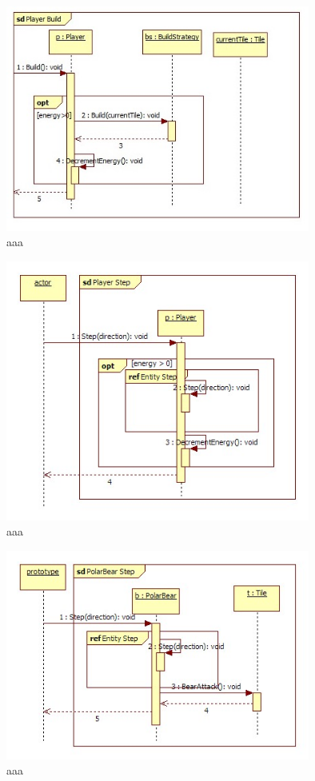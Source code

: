 \begin{figure}[H]
        \begin{center}
                \includegraphics[width=10cm]{chapters/chapter07/seqdiag/Player_Build.jpg}
                \caption{aaa}
                \label{bbb}
        \end{center}
\end{figure}
\begin{figure}[H]
        \begin{center}
                \includegraphics[width=10cm]{chapters/chapter07/seqdiag/Player_Step.jpg}
                \caption{aaa}
                \label{bbb}
        \end{center}
\end{figure}
\begin{figure}[H]
        \begin{center}
                \includegraphics[width=10cm]{chapters/chapter07/seqdiag/PolarBear_Step.jpg}
                \caption{aaa}
                \label{bbb}
        \end{center}
\end{figure}
